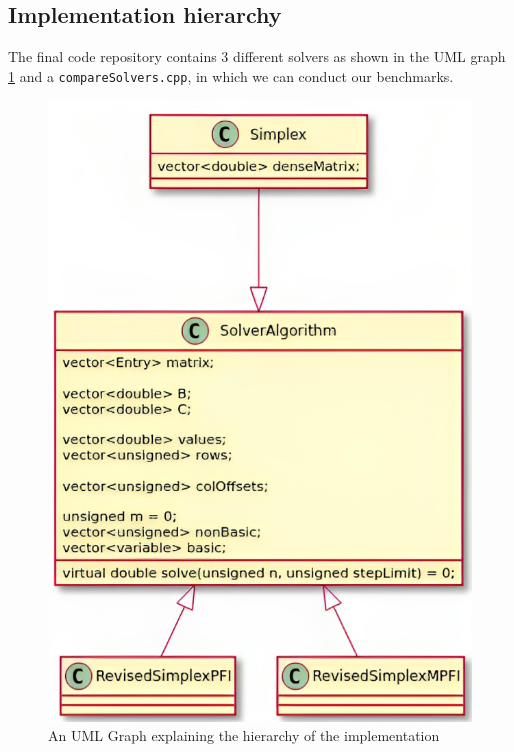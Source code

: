 \subsection{Implementation hierarchy}
The final code repository contains 3 different solvers as shown in the
UML graph \ref{fig:hierarchy}
and a \verb|compareSolvers.cpp|, in which we can conduct our benchmarks.
\begin{figure}[htpb]
    \centering
    \includegraphics[height=0.6\textheight]{figures/UML.png}
    \caption{An UML Graph explaining the hierarchy of the implementation}
    \label{fig:hierarchy}
\end{figure}

